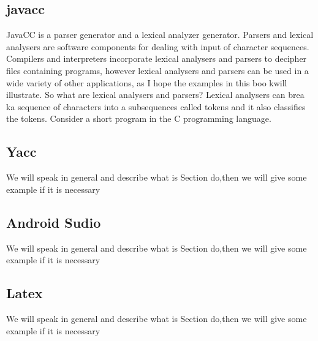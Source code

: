 \subsection{javacc}
JavaCC is a parser generator and a lexical analyzer generator. Parsers and lexical analysers
are software components for dealing with input of character sequences. Compilers and
interpreters incorporate lexical analysers and parsers to decipher files containing programs,
however lexical analysers and parsers can be used in a wide variety of other applications,
as I hope the examples in this boo kwill illustrate.
So what are lexical analysers and parsers? Lexical analysers can brea ka sequence of
characters into a subsequences called
tokens
and it also classifies the tokens. Consider a
short program in the C programming language.

\subsection{Yacc}
We will speak in general and describe what is Section do,then we will give some example if it is necessary


\subsection{Android Sudio}
We will speak in general and describe what is Section do,then we will give some example if it is necessary

\subsection{Latex}
We will speak in general and describe what is Section do,then we will give some example if it is necessary

